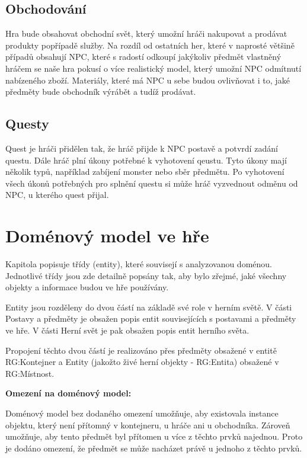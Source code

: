 \documentclass[12pt,a4paper]{article}
\begin{document}
\subsection{Obchodování} \label{procesy:obchod}
Hra bude obsahovat obchodní svět, který umožní hráči nakupovat a prodávat
produkty popřípadě služby. Na rozdíl od ostatních her, které v naprosté většině
případů obsahují NPC, které s radostí odkoupí jakýkoliv předmět vlastněný hráčem
se naše hra pokusí o více realistický model, který umožní NPC odmítnutí
nabízeného zboží. Materiály, které má NPC u sebe budou ovlivňovat i to, jaké
předměty bude obchodník výrábět a tudíž prodávat.

\subsection{Questy} \label{procesy:questy}
Quest je hráči přidělen tak, že hráč přijde k NPC postavě a potvrdí zadání
questu. Dále hráč plní úkony potřebné k vyhotovení qeustu. Tyto úkony mají
několik typů, například zabíjení monster nebo sběr předmětu. Po vyhotovení všech
úkonů potřebných pro splnění questu si může hráč vyzvednout odměnu od NPC, u
kterého quest přijal.




\section{Doménový model ve hře}
Kapitola popisuje třídy (entity), které souvisejí s analyzovanou doménou.
Jednotlivé třídy jsou zde detailně popsány tak, aby bylo zřejmé, jaké všechny
objekty a informace budou ve hře používány.

Entity jsou rozděleny do dvou částí na základě své role v herním světě. V části
Postavy a předměty je obsažen popis entit souvisejících s postavami a předměty
ve hře.  V části Herní svět je pak obsažen popis entit herního světa.

Propojení těchto dvou částí je realizováno přes předměty obsažené v entitě
RG:Kontejner a Entity (jakožto živé herní objekty - RG:Entita) obsažené v
RG:Místnost.

\bigskip
\noindent
\bf
Omezení na doménový model:
\rm

Doménový model bez dodaného omezení umožňuje, aby existovala instance objektu,
který není přítomný v kontejneru, u hráče ani u obchodníka. Zároveň umožňuje,
aby tento předmět byl přítomen u více z těchto prvků najednou. Proto je dodáno
omezení, že předmět se může nacházet právě u jednoho z těchto prvků.
\end{document}
